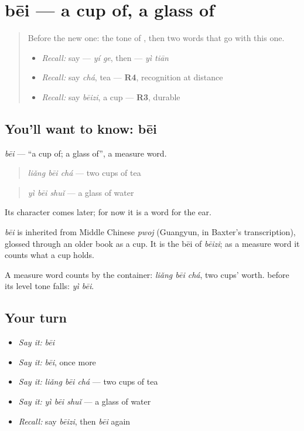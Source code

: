 \section[bēi]{bēi — a cup of, a glass of}

\label{lesson:ZH-C88-bei}



\begin{quote}
Before the new one: the tone of , then two words that go with this one.

\begin{itemize}
\raggedright
  \item \emph{Recall:} say  — \emph{yí ge}, then  — \emph{yì tiān}
  \item \emph{Recall:} say \emph{chá}, tea — \textbf{R4}, recognition at distance
  \item \emph{Recall:} say \emph{bēizi}, a cup — \textbf{R3}, durable
\end{itemize}
\end{quote}

\subsection*{You'll want to know: bēi}
\emph{bēi} — \textquotedblleft{}a cup of; a glass of\textquotedblright{}, a measure word.

\begin{quote}
\emph{liǎng bēi chá} — two cups of tea
\end{quote}

\begin{quote}
\emph{yì bēi shuǐ} — a glass of water
\end{quote}

Its character comes later; for now it is a word for the ear.

\begin{cousinweb}
\emph{bēi} is inherited from Middle Chinese \emph{pwoj} (Guangyun, in Baxter's transcription), glossed through an older book as a cup. It is the bēi of \emph{bēizi}; as a measure word it counts what a cup holds.
\end{cousinweb}

\begin{grammarlens}[title={What you've built}]
A measure word counts by the container: \emph{liǎng bēi chá}, two cups' worth.  before its level tone falls: \emph{yì bēi}.
\end{grammarlens}

\subsection*{Your turn}
\begin{itemize}
\raggedright
  \item \emph{Say it:} \emph{bēi}
  \item \emph{Say it:} \emph{bēi}, once more
  \item \emph{Say it:} \emph{liǎng bēi chá} — two cups of tea
  \item \emph{Say it:} \emph{yì bēi shuǐ} — a glass of water
  \item \emph{Recall:} say \emph{bēizi}, then \emph{bēi} again
\end{itemize}

